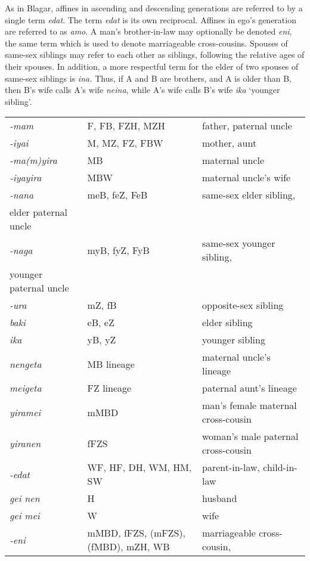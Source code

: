 As in Blagar, affines in ascending and descending generations are referred to by a single term \textit{edat}. The term \textit{edat} is its own reciprocal. Affines in ego's generation are referred to as \textit{amo}. A man's brother-in-law may optionally be denoted \textit{eni}, the same term which is used to denote marriageable cross-cousins. Spouses of same-sex siblings may refer to each other as siblings, following the relative ages of their spouses. In addition, a more respectful term for the elder of two spouses of same-sex siblings is \textit{ina.} Thus, if A and B are brothers, and A is older than B, then B's wife calls A's wife \textit{neina}, while A's wife calls B's wife \textit{ika} `younger sibling'.




\begin{table}\centering


\begin{tabular}{p{3cm}p{3cm}p{5cm}}
\textit{{}-mam} & F, FB, FZH, MZH & father, paternal uncle\\
\textit{{}-iyai} & M, MZ, FZ, FBW & mother, aunt\\
\textit{{}-ma(m)yira} & MB & maternal uncle\\
\textit{{}-iyayira} & MBW & maternal uncle's wife\\
\textit{{}-nana} & meB, feZ, FeB & same-sex elder sibling, \\
elder paternal uncle\\
\textit{{}-naga} & myB, fyZ, FyB & same-sex younger sibling, \\
younger paternal uncle\\
\textit{{}-ura} & mZ, fB & opposite-sex sibling\\
\textit{baki} & eB, eZ & elder sibling\\
\textit{ika} & yB, yZ & younger sibling\\
\textit{nengeta} & MB lineage & maternal uncle's lineage\\
\textit{meigeta} & FZ lineage & paternal aunt's lineage\\
\textit{yiramei} & mMBD & man's female maternal cross-cousin\\
\textit{yiranen} & fFZS & woman's male paternal cross-cousin\\
\textit{{}-edat} & WF, HF, DH, WM, HM, SW & parent-in-law, child-in-law\\
\textit{gei nen} & H & husband\\
\textit{gei mei} & W & wife\\
\textit{{}-eni} & mMBD, fFZS, (mFZS), (fMBD), mZH, WB & marriageable cross-cousin,


\end{tabular}
\end{table}
